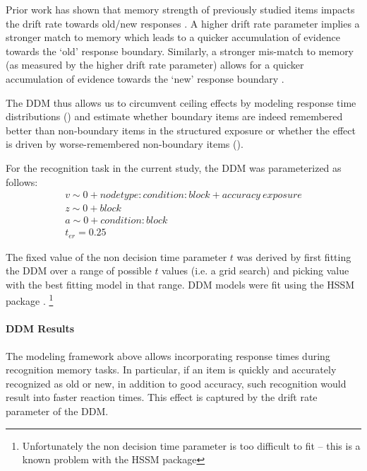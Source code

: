 Prior work has shown that memory strength of previously studied items impacts the drift rate towards old/new responses \parencite{ratcliff2004diffusion,ratcliff2022discriminating}. A higher drift rate parameter implies a stronger match to memory which leads to a quicker accumulation of evidence towards the `old' response boundary. Similarly, a stronger mis-match to memory (as measured by the higher drift rate parameter) allows for a quicker accumulation of evidence towards the `new' response boundary \parencite{ratcliff2004diffusion,ratcliff2022discriminating}. 

The DDM thus allows us to circumvent ceiling effects by modeling response time distributions () and estimate whether boundary items are indeed remembered better than non-boundary items in the structured exposure or whether the effect is driven by worse-remembered non-boundary items (). 

For the recognition task in the current study, the DDM was parameterized as follows: 
\begin{equation}
    \begin{aligned}
        v \sim 0 + node type:condition:block + accuracy\ exposure \\
        z \sim 0 + block \\
        a \sim 0 + condition:block \\
        t_{er} = 0.25
    \end{aligned}
\end{equation}

The fixed value of the non decision time parameter $t$ was derived by first fitting the DDM over a range of possible $t$ values (i.e. a grid search) and picking value with the best fitting model in that range. DDM models were fit using the HSSM package \parencite{fengler2022beyond}. \footnote{Unfortunately the non decision time parameter is too difficult to fit -- this is a known problem with the HSSM package} 

\paragraph*{DDM Results}
The modeling framework above allows incorporating response times during recognition memory tasks. In particular, if an item is quickly and accurately recognized as old or new, in addition to good accuracy, such recognition would result into faster reaction times. This effect is captured by the drift rate parameter of the DDM. 

